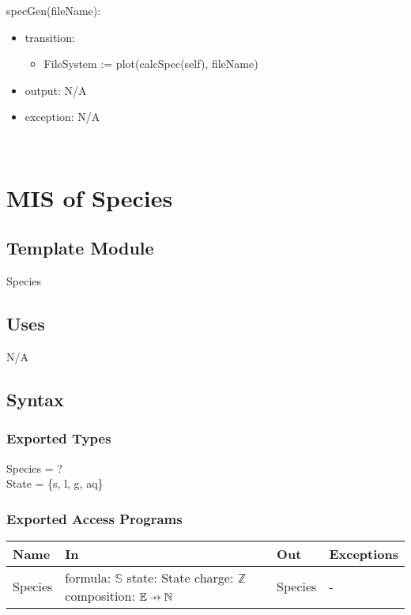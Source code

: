 \documentclass[12pt, titlepage]{article}
\newcommand\pfun{\mathrel{\ooalign{\hfil$\mapstochar\mkern5mu$\hfil\cr$\to$\cr}}}
\begin{document}
\noindent specGen(fileName):
\begin{itemize}
\item transition: \begin{itemize} 
                  \item[] FileSystem := plot(calcSpec(self), fileName)
                  \end{itemize}
\item output: N/A
\item exception: N/A
\end{itemize}

~\newpage

\section{MIS of Species} \label{Module:Species}

\subsection{Template Module}

Species

\subsection{Uses}

N/A

\subsection{Syntax}

\subsubsection{Exported Types}

Species = ?\\
State = \{s, l, g, aq\}

\subsubsection{Exported Access Programs}

\begin{center}
\begin{tabular}{p{2cm} p{4cm} p{4cm} p{2cm}}
\hline
\textbf{Name} & \textbf{In} & \textbf{Out} & \textbf{Exceptions} \\
\hline
Species & formula: $\mathbb{S}$ 
          \newline state: State
          \newline charge: $\mathbb{Z}$
          \newline composition: $\mathbb{E} \pfun \mathbb{N}$ 
                 & Species & - \\
\hline
\end{tabular}
\end{center}
\end{document}
